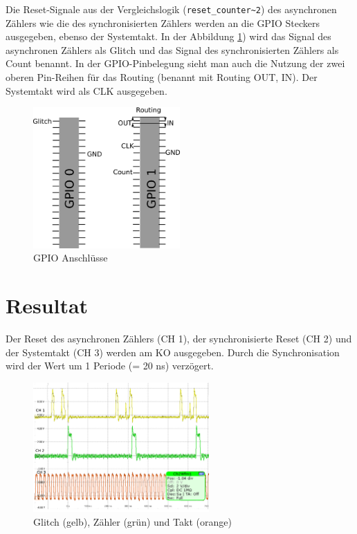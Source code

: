 Die Reset-Signale aus der Vergleichslogik (\lstinline|reset_counter~2|) des asynchronen Zählers wie die des synchronisierten Zählers werden an die GPIO Steckers ausgegeben, ebenso der Systemtakt. In der Abbildung \ref{fig.glitch.GPIO}) wird das Signal des asynchronen Zählers als Glitch und das Signal des synchronisierten Zählers als Count benannt. In der GPIO-Pinbelegung sieht man auch die Nutzung der zwei oberen Pin-Reihen für das Routing (benannt mit Routing OUT, IN). Der Systemtakt wird als CLK ausgegeben.

\begin{figure}[H]
	\includegraphics[width=0.5\textwidth]{images/glitch/GPIO_Belegung.png}
	\caption{GPIO Anschlüsse}
	\label{fig.glitch.GPIO}
\end{figure}


\newpage
\section{Resultat }\label{sect.glitch_resultat}

Der Reset des asynchronen Zählers (CH 1), der synchronisierte Reset (CH 2) und der Systemtakt (CH 3) werden am KO ausgegeben. Durch die Synchronisation wird der Wert um 1 Periode (= 20 ns) verzögert.

\begin{figure}[H]
	\includegraphics[width=0.6\textwidth]{images/glitch/Glitch_2_good.png}
	\caption{Glitch (gelb), Zähler (grün) und Takt (orange)}
	\label{fig.glitch.result_1}
\end{figure}

